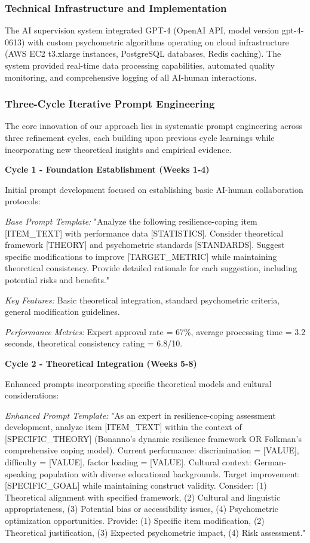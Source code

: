 \documentclass[12pt,a4paper]{article}
\begin{document}
\subsubsection{Technical Infrastructure and Implementation}

The AI supervision system integrated GPT-4 (OpenAI API, model version gpt-4-0613) with custom psychometric algorithms operating on cloud infrastructure (AWS EC2 t3.xlarge instances, PostgreSQL databases, Redis caching). The system provided real-time data processing capabilities, automated quality monitoring, and comprehensive logging of all AI-human interactions.

\subsubsection{Three-Cycle Iterative Prompt Engineering}

The core innovation of our approach lies in systematic prompt engineering across three refinement cycles, each building upon previous cycle learnings while incorporating new theoretical insights and empirical evidence.

\textbf{Cycle 1 - Foundation Establishment (Weeks 1-4)}

Initial prompt development focused on establishing basic AI-human collaboration protocols:

\textit{Base Prompt Template:} "Analyze the following resilience-coping item [ITEM_TEXT] with performance data [STATISTICS]. Consider theoretical framework [THEORY] and psychometric standards [STANDARDS]. Suggest specific modifications to improve [TARGET_METRIC] while maintaining theoretical consistency. Provide detailed rationale for each suggestion, including potential risks and benefits."

\textit{Key Features:} Basic theoretical integration, standard psychometric criteria, general modification guidelines.

\textit{Performance Metrics:} Expert approval rate = 67\%, average processing time = 3.2 seconds, theoretical consistency rating = 6.8/10.

\textbf{Cycle 2 - Theoretical Integration (Weeks 5-8)}

Enhanced prompts incorporating specific theoretical models and cultural considerations:

\textit{Enhanced Prompt Template:} "As an expert in resilience-coping assessment development, analyze item [ITEM_TEXT] within the context of [SPECIFIC_THEORY] (Bonanno's dynamic resilience framework OR Folkman's comprehensive coping model). Current performance: discrimination = [VALUE], difficulty = [VALUE], factor loading = [VALUE]. Cultural context: German-speaking population with diverse educational backgrounds. Target improvement: [SPECIFIC_GOAL] while maintaining construct validity. Consider: (1) Theoretical alignment with specified framework, (2) Cultural and linguistic appropriateness, (3) Potential bias or accessibility issues, (4) Psychometric optimization opportunities. Provide: (1) Specific item modification, (2) Theoretical justification, (3) Expected psychometric impact, (4) Risk assessment."
\end{document}
